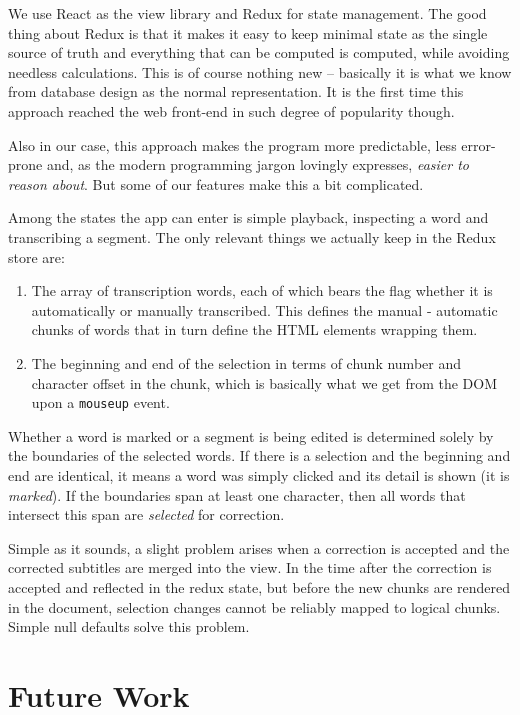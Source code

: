 \documentclass{svproc}
\begin{document}
We use React as the view library and Redux\cite{abramov2015redux} for state
management. The good thing about Redux is that it makes it easy to keep minimal
state as the single source of truth and everything that can be computed is
computed, while avoiding needless calculations. This is of course nothing new --
basically it is what we know from database design as the normal
representation\cite{codd1970relational}. It is the first time this approach
reached the web front-end in such degree of popularity though.

Also in our case, this approach makes the program more predictable, less
error-prone and, as the modern programming jargon lovingly expresses, {\em
easier to reason about}. But some of our features make this a bit complicated.

Among the states the app can enter is simple playback, inspecting a word and
transcribing a segment. The only relevant things we actually keep in the
Redux store are:

\begin{enumerate}
\item{
    The array of transcription words, each of which bears the flag whether it is
    automatically or manually transcribed. This defines the manual - automatic
    chunks of words that in turn define the HTML elements wrapping them.
}
\item{
    The beginning and end of the selection in terms of chunk number and
    character offset in the chunk, which is basically what we get from the DOM
    upon a \texttt{mouseup} event.
}
\end{enumerate}

Whether a word is marked or a segment is being edited is determined solely by
the boundaries of the selected words. If there is a selection and the beginning
and end are identical, it means a word was simply clicked and its detail is
shown (it is {\em marked}). If the boundaries span at least one character, then
all words that intersect this span are {\em selected} for correction.

Simple as it sounds, a slight problem arises when a correction is accepted and
the corrected subtitles are merged into the view. In the time after the
correction is accepted and reflected in the redux state, but before the new
chunks are rendered in the document, selection changes cannot be reliably mapped
to logical chunks. Simple null defaults solve this problem.

\section{Future Work}
\end{document}
